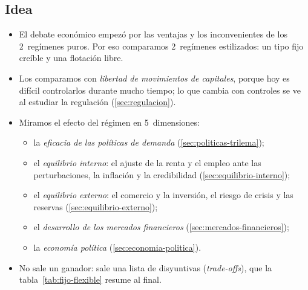 \documentclass[11pt]{article}
\begin{document}
\begin{infografia}[p]
\centering
\caption{Cómo se organiza el apartado~\ref{sec:diseno}: los argumentos teóricos y sus implicaciones para cada régimen}\label{figu:estructura-diseno}
\end{infografia}

\subsection{Idea}\label{sec:idea}

\begin{itemize}
\item El debate económico empezó por las ventajas y los inconvenientes de los 2~regímenes puros. Por eso comparamos 2~regímenes estilizados: un tipo fijo creíble y una flotación libre.
\item Los comparamos con \emph{libertad de movimientos de capitales}, porque hoy es difícil controlarlos durante mucho tiempo; lo que cambia con controles se ve al estudiar la regulación (\ref{sec:regulacion}).
\item Miramos el efecto del régimen en 5~dimensiones:
  \begin{itemize}
  \item la \emph{eficacia de las políticas de demanda} (\ref{sec:politicas-trilema});
  \item el \emph{equilibrio interno}: el ajuste de la renta y el empleo ante las perturbaciones, la inflación y la credibilidad (\ref{sec:equilibrio-interno});
  \item el \emph{equilibrio externo}: el comercio y la inversión, el riesgo de crisis y las reservas (\ref{sec:equilibrio-externo});
  \item el \emph{desarrollo de los mercados financieros} (\ref{sec:mercados-financieros});
  \item la \emph{economía política} (\ref{sec:economia-politica}).
  \end{itemize}
\item No sale un ganador: sale una lista de disyuntivas (\emph{trade-offs}), que la tabla~\ref{tab:fijo-flexible} resume al final.
\end{itemize}

\end{document}
